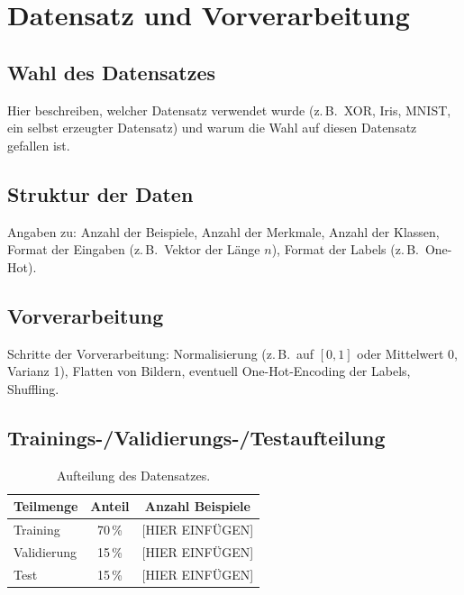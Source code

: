 \section{Datensatz und Vorverarbeitung}
\label{sec:datensatz}

\subsection{Wahl des Datensatzes}

\begin{hinweisbox}[Platzhalter]
Hier beschreiben, welcher Datensatz verwendet wurde (z.\,B.\ XOR, Iris, MNIST, ein selbst erzeugter Datensatz) und warum die Wahl auf diesen Datensatz gefallen ist.
\end{hinweisbox}

\subsection{Struktur der Daten}

\begin{hinweisbox}[Platzhalter]
Angaben zu: Anzahl der Beispiele, Anzahl der Merkmale, Anzahl der Klassen, Format der Eingaben (z.\,B.\ Vektor der Länge $n$), Format der Labels (z.\,B.\ One-Hot).
\end{hinweisbox}

\subsection{Vorverarbeitung}

\begin{hinweisbox}[Platzhalter]
Schritte der Vorverarbeitung: Normalisierung (z.\,B.\ auf $[0,1]$ oder Mittelwert 0, Varianz 1), Flatten von Bildern, eventuell One-Hot-Encoding der Labels, Shuffling.
\end{hinweisbox}

\subsection{Trainings-/Validierungs-/Testaufteilung}

\begin{table}[htbp]
    \centering
    \small
    \begin{tabular}{l c c}
    \toprule
    \textbf{Teilmenge} & \textbf{Anteil} & \textbf{Anzahl Beispiele} \\
    \midrule
    Training    & 70\,\% & [HIER EINFÜGEN] \\
    Validierung & 15\,\% & [HIER EINFÜGEN] \\
    Test        & 15\,\% & [HIER EINFÜGEN] \\
    \bottomrule
    \end{tabular}
    \caption{Aufteilung des Datensatzes.}
    \label{tab:datenaufteilung}
\end{table}

\newpage